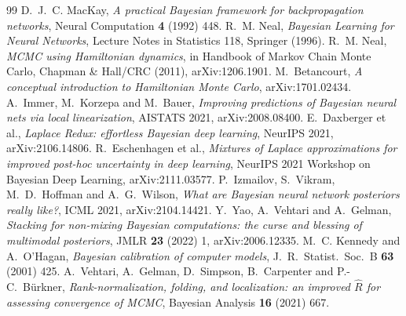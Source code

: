 \begin{thebibliography}{99}
 D.~J.~C. MacKay, \emph{A practical Bayesian framework for
  backpropagation networks}, Neural Computation \textbf{4} (1992) 448.
 R.~M. Neal, \emph{Bayesian Learning for Neural Networks}, Lecture Notes
  in Statistics 118, Springer (1996).
 R.~M. Neal, \emph{MCMC using Hamiltonian dynamics}, in Handbook of
  Markov Chain Monte Carlo, Chapman \& Hall/CRC (2011), arXiv:1206.1901.
 M.~Betancourt, \emph{A conceptual introduction to Hamiltonian
  Monte Carlo}, arXiv:1701.02434.
 A.~Immer, M.~Korzepa and M.~Bauer, \emph{Improving predictions of
  Bayesian neural nets via local linearization}, AISTATS 2021, arXiv:2008.08400.
 E.~Daxberger et al., \emph{Laplace Redux: effortless Bayesian
  deep learning}, NeurIPS 2021, arXiv:2106.14806.
 R.~Eschenhagen et al., \emph{Mixtures of Laplace approximations
  for improved post-hoc uncertainty in deep learning}, NeurIPS 2021 Workshop on Bayesian
  Deep Learning, arXiv:2111.03577.
 P.~Izmailov, S.~Vikram, M.~D.~Hoffman and A.~G.~Wilson, \emph{What
  are Bayesian neural network posteriors really like?}, ICML 2021, arXiv:2104.14421.
 Y.~Yao, A.~Vehtari and A.~Gelman, \emph{Stacking for non-mixing Bayesian
  computations: the curse and blessing of multimodal posteriors}, JMLR \textbf{23} (2022) 1,
  arXiv:2006.12335.
 M.~C. Kennedy and A.~O'Hagan, \emph{Bayesian calibration of computer
  models}, J.~R.~Statist.\ Soc.~B \textbf{63} (2001) 425.
 A.~Vehtari, A.~Gelman, D.~Simpson, B.~Carpenter and
  P.-C.~B\"urkner, \emph{Rank-normalization, folding, and localization: an improved
  $\hat R$ for assessing convergence of MCMC}, Bayesian Analysis \textbf{16} (2021) 667.
\end{thebibliography}


